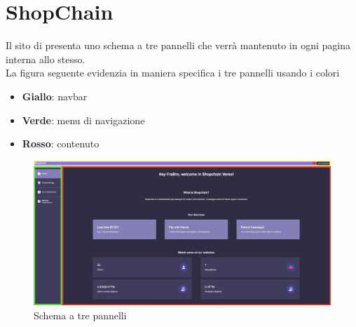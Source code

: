 \section{ShopChain}
Il sito di \projectName{} presenta uno schema a tre pannelli che verrà mantenuto in ogni pagina interna allo stesso.\\
La figura seguente evidenzia in maniera specifica i tre pannelli usando i colori
\begin{itemize}
    \item \textbf{Giallo}: navbar
    \item \textbf{Verde}: menu di navigazione
    \item \textbf{Rosso}: contenuto
\end{itemize}
\begin{figure}[H]
    \centering
    \includegraphics[scale=0.2]{immagini/trePannelli.png}
    \caption{Schema a tre pannelli}
\end{figure}


